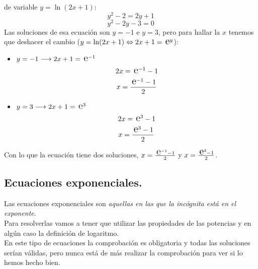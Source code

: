 \documentclass[a4paper,11pt,answers]{exam}
\newcommand{\e}{\,\text{\Large e}}
\begin{document}
\begin{itemize}
\begin{questions}
\begin{solution}
      de variable $y = \ln (2x + 1)$:
      \[y^2 - 2 = 2y +1\]
      \[y^2 - 2y - 3 = 0\]
      Las soluciones de esa ecuación son $y = -1$ e $y = 3$, pero para hallar la $x$ tenemos que
      deshacer el cambio ($y = \ln (2x + 1) \Leftrightarrow 2x + 1 = \e^y$):
      \begin{itemize}
      \item $y = -1 \longrightarrow 2x+ 1 = \e^{-1}$
        \[2x = \e^{-1} - 1\]
        \[x = \frac{\e^{-1}-1}{2}\]
      \item $y = 3 \longrightarrow 2x + 1 = \e^3$
        \[2x = \e^3 - 1\]
        \[x = \frac{\e^3 - 1}{2}\]
      \end{itemize}
      Con lo que la ecuación tiene dos soluciones, $x = \frac{\e^{-1}-1}{2}$ y $x = \frac{\e^3-1}{2}$.
    \end{solution}
  \end{questions}
\end{itemize}
\subsection{Ecuaciones exponenciales.}
Las ecuaciones exponenciales son \emph{aquellas en las que la incógnita está en el exponente}.\\
Para resolverlas vamos a tener que utilizar las propiedades de las potencias y en algún caso la definición de logaritmo.\\

En este tipo de ecuaciones la comprobación es obligatoria y todas las soluciones serían válidas,
pero nunca está de más realizar la comprobación para ver si lo hemos hecho bien.\\
\end{document}

